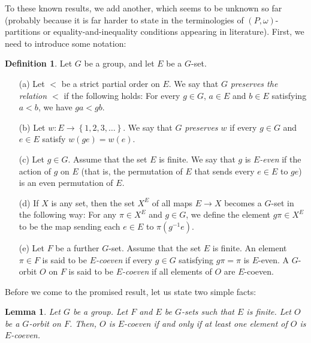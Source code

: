 \documentclass[12pt]{article}
\theoremstyle{plain}
\newtheorem{lemma}[theorem]{Lemma}
\theoremstyle{definition}
\newtheorem{definition}[theorem]{Definition}
\theoremstyle{remark}
\begin{document}
To these known results, we add another, which seems to be unknown so
far (probably because it is far harder to state in the terminologies
of $\left(P, \omega\right)$-partitions or
equality-and-inequality conditions appearing in literature). First,
we need to introduce some notation:

\begin{definition}
\label{def.G-sets.terminology}
Let $G$ be a group, and let $E$ be a $G$-set.

\begin{itemize}

\item[(a)] Let $<$ be a
strict partial order on $E$. We say that $G$
\textit{preserves the relation $<$} if the following holds:
For every $g \in G$, $a \in E$ and $b \in E$ satisfying $a < b$,
we have $ga < gb$.

\item[(b)] Let $w : E \to \left\{1, 2, 3, \ldots\right\}$. We
say that $G$ \textit{preserves $w$} if every $g \in G$ and
$e \in E$ satisfy $w\left(ge\right) = w\left(e\right)$.

\item[(c)] Let $g \in G$. Assume that the set $E$ is finite.
We say that $g$ is \textit{$E$-even}
if the action of $g$ on $E$ (that is, the permutation of $E$
that sends every $e \in E$ to $ge$) is an even permutation
of $E$.

\item[(d)] If $X$ is any set, then the set $X^E$ of all maps
$E \to X$ becomes a $G$-set in the following way: For any
$\pi \in X^E$ and $g \in G$, we define the element $g\pi \in X^E$
to be the map sending each $e \in E$ to $\pi\left(g^{-1}e\right)$.

\item[(e)] Let $F$ be a further $G$-set. Assume that the set
$E$ is finite. An element $\pi \in F$
is said to be \textit{$E$-coeven} if every $g \in G$
satisfying $g\pi = \pi$ is $E$-even. A $G$-orbit $O$ on $F$ is said
to be \textit{$E$-coeven} if all elements of $O$ are $E$-coeven.

\end{itemize}
\end{definition}

Before we come to the promised result, let us state two simple facts:

\begin{lemma}
\label{lem.coeven.all-one}
Let $G$ be a group. Let $F$ and $E$ be $G$-sets such that $E$ is
finite. Let $O$ be a
$G$-orbit on $F$. Then, $O$ is $E$-coeven if and only if at least
one element of $O$ is $E$-coeven.
\end{lemma}
\end{document}
